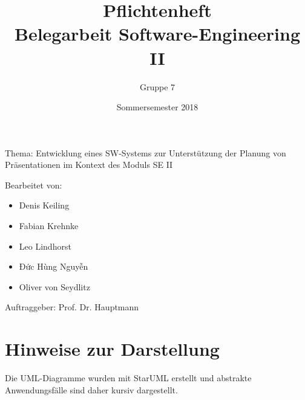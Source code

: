 \documentclass[a4paper]{scrartcl}
\title{Pflichtenheft \\ \large Belegarbeit Software-Engineering II}
\author{Gruppe 7}
\date{Sommersemester 2018}
\begin{document}
\maketitle

Thema: Entwicklung eines SW‐Systems zur Unterstützung der Planung von Präsentationen im Kontext des Moduls SE II

Bearbeitet von:
\begin{itemize}
  \item Denis Keiling
  \item Fabian Krehnke
  \item Leo Lindhorst
  \item Đức Hùng Nguyễn
  \item Oliver von Seydlitz
\end{itemize}
Auftraggeber: Prof. Dr. Hauptmann

\newpage
\tableofcontents

\listoffigures
\newpage

\section*{Hinweise zur Darstellung}
Die UML-Diagramme wurden mit StarUML erstellt und abstrakte Anwendungsfälle sind daher kursiv dargestellt.










\end{document}
